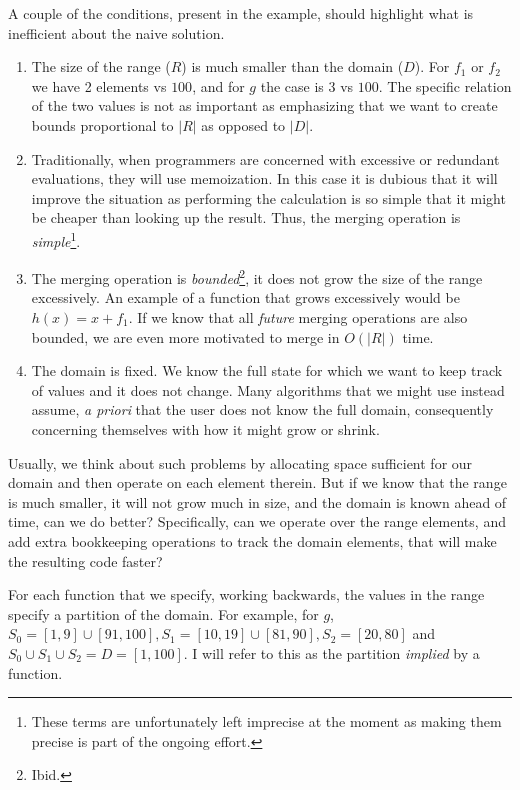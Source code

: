 \documentclass{article}
\begin{document}
A couple of the conditions,
present in the example,
should highlight what is inefficient about the naive solution.
\begin{enumerate}
  \item The size of the range ($R$) is much smaller than the domain ($D$).
    For $f_{1}$ or $f_{2}$ we have 2 elements vs $100$,
    and for $g$ the case is $3$ vs $100$.
    The specific relation of the two values is not as important as emphasizing
    that we want to create bounds proportional to $|R|$ as opposed to $|D|$.

  \item Traditionally,
    when programmers are concerned with excessive or redundant evaluations,
    they will use memoization.
    In this case it is dubious that it will improve the situation as
    performing the calculation
    is so simple that it might be cheaper than looking up the result.
    Thus, the merging operation is \emph{simple}\footnote{
      These terms are unfortunately left imprecise at the moment as making
      them precise is part of the ongoing effort.}.

  \item The merging operation is \emph{bounded}\footnote{Ibid.},
    it does not grow the size of the range excessively.
    An example of a function that grows excessively would be $h(x) = x + f_{1}$.
    If we know that all \emph{future} merging operations are also bounded,
    we are even more motivated to merge in $O(|R|)$ time.

  \item The domain is fixed.
    We know the full state for which we want to keep track of values and it
    does not change.
    Many algorithms that we might use instead assume,
    \emph{a priori} that the user does not know the full domain,
    consequently concerning themselves with how it might grow or shrink.

\end{enumerate}

Usually,
we think about such problems by allocating space sufficient for our domain
and then operate on each element therein.
But if we know that the range is much smaller,
it will not grow much in size,
and the domain is known ahead of time,
can we do better?
Specifically,
can we operate over the range elements,
and add extra bookkeeping operations to track the domain elements,
that will make the resulting code faster?

For each function that we specify,
working backwards,
the values in the range specify a partition of the domain.
For example,
for $g$, $S_{0} = [1,9]\cup [91,100], S_{1} = [10,19] \cup [81,90], S_{2} = [20,80]$
and $S_{0} \cup S_{1} \cup S_{2} = D = [1,100]$.
I will refer to this as the partition \emph{implied} by a function.
\end{document}
